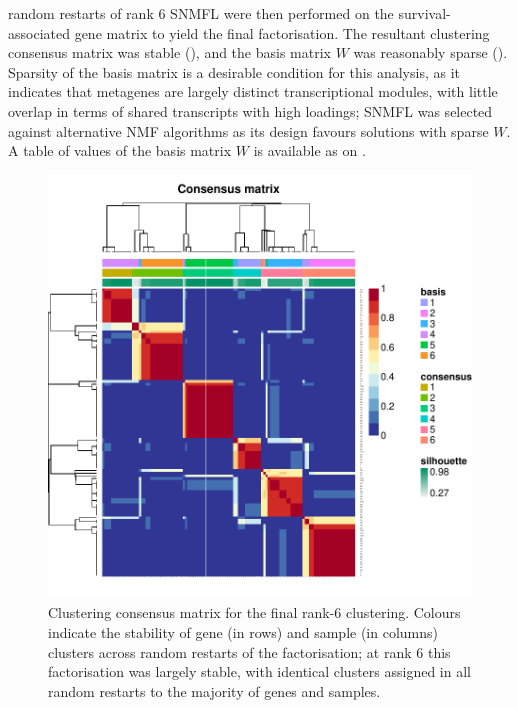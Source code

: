 \documentclass[dissertation.tex]{subfiles}
\begin{document}
 random restarts of rank 6 \gls{SNMFL} were then performed on the survival-associated gene matrix to yield the final factorisation.  The resultant clustering consensus matrix was stable (), and the basis matrix $W$ was reasonably sparse ().  Sparsity of the basis matrix is a desirable condition for this analysis, as it indicates that metagenes are largely distinct transcriptional modules, with little overlap in terms of shared transcripts with high loadings; \gls{SNMFL} was selected against alternative \gls{NMF} algorithms as its design favours solutions with sparse $W$.  A table of values of the basis matrix $W$ is available as  on .

\begin{figure}[!htbp]
\centering
\includegraphics[width=\linewidth]{analysis/biosurv/reports/18_SIS_diag_dsd_final/figure/nmf-plots-1}
\caption[Consensus matrix for the final rank-6 clustering]{Clustering consensus matrix for the final rank-6 clustering.  Colours indicate the stability of gene (in rows) and sample (in columns) clusters across random restarts of the factorisation; at rank 6 this factorisation was largely stable, with identical clusters assigned in all  random restarts to the majority of genes and samples.}\label{fig:sigs-nmf-consensus}
\end{figure}
\end{document}
